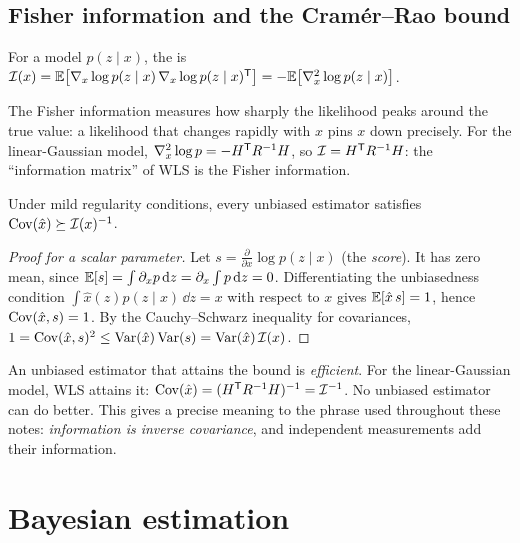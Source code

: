 \subsection{Fisher information and the Cram\'er--Rao bound}

\begin{definition}
For a model $p(z\mid x)$, the  is
$\mathcal I(x) = \mathbb{E}\big[\nabla_x\log p(z\mid x)\,\nabla_x\log p(z\mid x)^{\mathsf{T}}\big] = -\mathbb{E}\big[\nabla^2_x\log p(z\mid x)\big]$.
\end{definition}

The Fisher information measures how sharply the likelihood peaks around the true value: a likelihood that changes rapidly with $x$ pins $x$
down precisely. For the linear-Gaussian model, $\nabla^2_x\log p = -H^{\mathsf{T}} R^{-1} H$, so $\mathcal I = H^{\mathsf{T}} R^{-1} H$: the ``information matrix'' of WLS is the
Fisher information.

\begin{theorem}
\label{thm:crb}
Under mild regularity conditions, every unbiased estimator satisfies $\operatorname{Cov}(\hat x) \succeq \mathcal I(x)^{-1}$.
\end{theorem}
\begin{proof}[Proof for a scalar parameter]
Let $s = \frac{\partial}{\partial x}\log p(z\mid x)$ (the \emph{score}). It has zero mean, since $\mathbb{E}[s] = \int\partial_xp\,\mathrm{d} z = \partial_x\int p\,\mathrm{d} z = 0$. Differentiating the
unbiasedness condition $\int\hat x(z)p(z\mid x)\,\dd z = x$ with respect to $x$ gives $\mathbb{E}[\hat x\,s] = 1$, hence $\operatorname{Cov}(\hat x, s) = 1$. By the
Cauchy--Schwarz inequality for covariances, $1 = \operatorname{Cov}(\hat x, s)^2 \le \operatorname{Var}(\hat x)\operatorname{Var}(s) = \operatorname{Var}(\hat x)\,\mathcal I(x)$.
\end{proof}

An unbiased estimator that attains the bound is \emph{efficient}. For the linear-Gaussian model, WLS attains it: $\operatorname{Cov}(\hat x) = (H^{\mathsf{T}} R^{-1} H)^{-1} = \mathcal I^{-1}$.
No unbiased estimator can do better. This gives a precise meaning to the phrase used throughout these notes: \emph{information is inverse
covariance}, and independent measurements add their information.

\section{Bayesian estimation}

